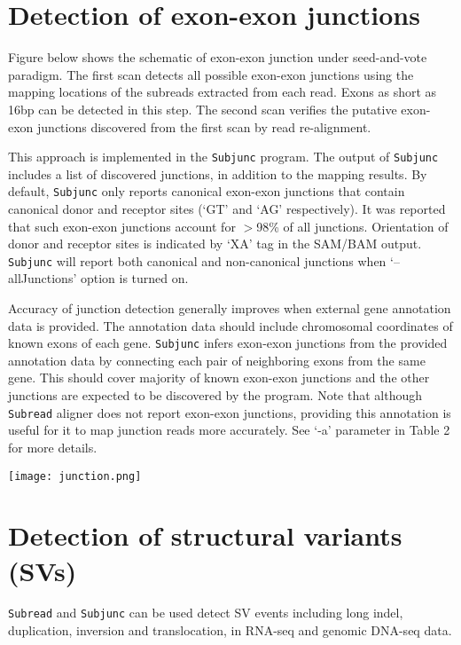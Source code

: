 \documentclass[12pt]{report}
\newcommand{\code}[1]{{\small\texttt{#1}}}
\begin{document}
\section{Detection of exon-exon junctions}
\label{sec:junction}

Figure below shows the schematic of exon-exon junction under seed-and-vote paradigm.
The first scan detects all possible exon-exon junctions using the mapping locations of the subreads extracted from each read.
Exons as short as 16bp can be detected in this step.
The second scan verifies the putative exon-exon junctions discovered from the first scan by read re-alignment.

This approach is implemented in the \code{Subjunc} program.
The output of \code{Subjunc} includes a list of discovered junctions, in addition to the mapping results.
By default, \code{Subjunc} only reports canonical exon-exon junctions that contain canonical donor and receptor sites (`GT' and `AG' respectively).
It was reported that such exon-exon junctions account for $>$98\% of all junctions.
Orientation of donor and receptor sites is indicated by `XA' tag in the SAM/BAM output.
\code{Subjunc} will report both canonical and non-canonical junctions when `--allJunctions' option is turned on.

Accuracy of junction detection generally improves when external gene annotation data is provided.
The annotation data should include chromosomal coordinates of known exons of each gene.
\code{Subjunc} infers exon-exon junctions from the provided annotation data by connecting each pair of neighboring exons from the same gene.
This should cover majority of known exon-exon junctions and the other junctions are expected to be discovered by the program.
Note that although \code{Subread} aligner does not report exon-exon junctions, providing this annotation is useful for it to map junction reads more accurately.
See `-a' parameter in Table 2 for more details.


\begin{center}
\texttt{[image: junction.png]}
\end{center}


\section{Detection of structural variants (SVs)}

\code{Subread} and \code{Subjunc} can be used detect SV events including long indel, duplication, inversion and translocation, in RNA-seq and genomic DNA-seq data.
\end{document}
